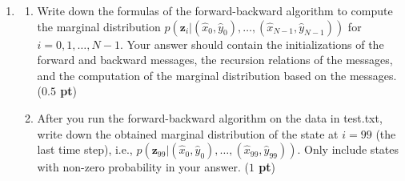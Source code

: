 \documentclass[twoside]{article}
\begin{document}
\begin{enumerate}

\item
\begin{enumerate}
\item  Write down the formulas of the forward-backward algorithm to compute the marginal distribution $p(\mathbf{z}_i|(\hat{x}_0,\hat{y}_0),\ldots,(\hat{x}_{N-1},\hat{y}_{N-1}))$ for $i=0,1,\ldots,N-1$. Your answer should contain the initializations of the forward and backward messages, the recursion relations of the messages, and the computation of the marginal distribution based on the messages. ({\bf $0.5$ pt})
\begin{center}
\end{center}

   \item After you run the forward-backward algorithm on the data in \textsf{test.txt}, write down the obtained marginal distribution of the state at $i=99$ (the last time step), i.e., $p(\mathbf{z}_{99}|(\hat{x}_0,\hat{y}_0),\ldots,(\hat{x}_{99},\hat{y}_{99}))$. Only include states with non-zero probability in your answer.
   ({\bf $1$ pt})


\end{enumerate}
\end{enumerate}
\end{document}
